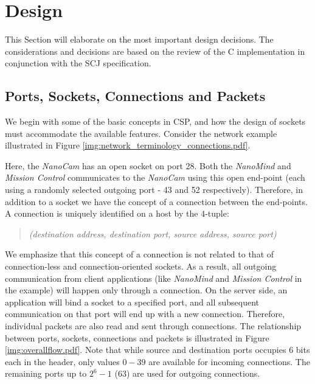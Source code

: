 \section{Design}
This Section will elaborate on the most important design decisions. The considerations and decisions are based on the review of the C implementation in conjunction with the SCJ specification.

\subsection{Ports, Sockets, Connections and Packets}
We begin with some of the basic concepts in CSP, and how the design of sockets must accommodate the available features. Consider the network example illustrated in Figure \ref{img:network_terminology_connections.pdf}. 


Here, the \textit{NanoCam} has an open socket on port 28. Both the \textit{NanoMind} and \textit{Mission Control} communicates to the \textit{NanoCam} using this open end-point (each using a randomly selected outgoing port - 43 and 52 respectively). Therefore, in addition to a socket we have the concept of a connection between the end-points. A connection is uniquely identified on a host by the 4-tuple:

\begin{quotation}
	\emph{(destination address, destination port, source address, source port)}
\end{quotation}

We emphasize that this concept of a connection is not related to that of connection-less and connection-oriented sockets. As a result, all outgoing communication from client applications (like \textit{NanoMind} and \textit{Mission Control} in the example) will happen only through a connection. On the server side, an application will bind a socket to a specified port, and all subsequent communication on that port will end up with a new connection. Therefore, individual packets are also read and sent through connections. The relationship between ports, sockets, connections and packets is illustrated in Figure \ref{img:overallflow.pdf}. Note that while source and destination ports occupies 6 bits each in the header, only values $0-39$ are available for incoming connections. The remaining ports up to $2^6-1$ (63) are used for outgoing connections.

